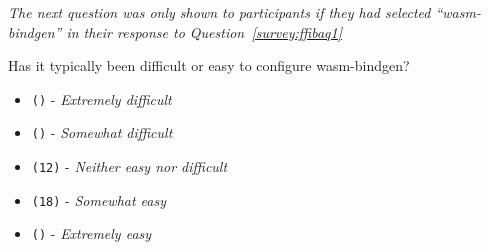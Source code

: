 \noindent \textit{The next question was only shown to participants if they had selected ``\textit{wasm-bindgen}'' in their response to Question~\ref{survey:ffibaq1}}
\begin{protocol}
\setcounter{protocoli}{2}
\item \label{survey:ffibaq3}  Has it typically been difficult or easy to configure wasm-bindgen?
\begin{itemize}
\item \texttt{()} - \textit{Extremely difficult}
\item \texttt{()} - \textit{Somewhat difficult}
\item \texttt{(12)} - \textit{Neither easy nor difficult}
\item \texttt{(18)} - \textit{Somewhat easy}
\item \texttt{()} - \textit{Extremely easy}
\end{itemize}
\end{protocol}

